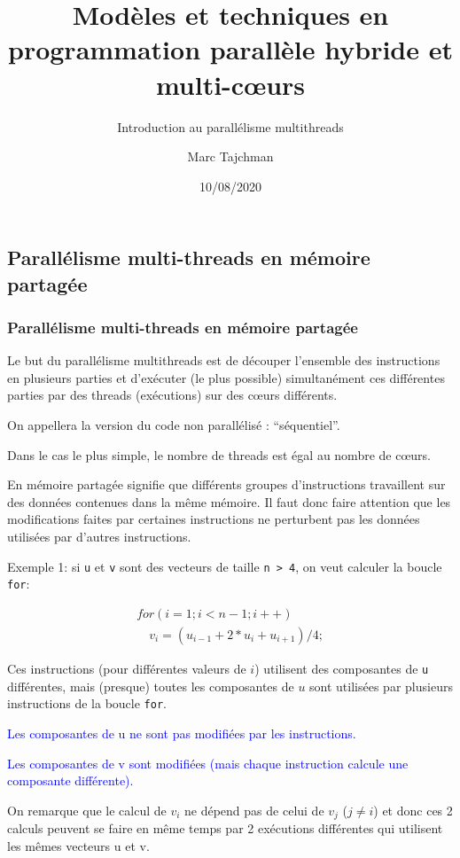 \documentclass{beamer}
\title{Modèles et techniques en programmation parallèle hybride et multi-c\oe urs}
\subtitle{Introduction au parall\'elisme multithreads}
\author{Marc Tajchman}\institute{CEA - DEN/DM2S/STMF/LMES}
\date{10/08/2020}
\begin{document}
\begin{frame}
	\titlepage
\end{frame}

\large
\begin{frame}
	\section{Parallélisme multi-threads en mémoire partagée}
	\frametitle{Parallélisme multi-threads en mémoire partagée}

	\vfill
	Le but du parallélisme multithreads est de découper l'ensemble des instructions en plusieurs parties et d'exécuter (le plus possible) simultanément ces différentes parties par des threads (exécutions) sur des c\oe urs différents.


	\vfill
	On appellera la version du code non parallélisé : ``séquentiel''.

	\vfill
    Dans le cas le plus simple, le nombre de threads est égal au nombre de c\oe urs.

	\vfill
	En mémoire partagée signifie que différents groupes d'instructions travaillent sur des données contenues dans la même mémoire. Il faut donc faire attention que les modifications faites par certaines instructions ne perturbent pas les données utilisées par d'autres instructions.
	\vfill

\end{frame}

\large
\begin{frame}[fragile]
	Exemple 1: si \verb|u| et \verb|v| sont des vecteurs de taille \verb|n > 4|, on veut calculer la boucle {\tt for}:

	\begin{equation}
	\begin{array}{l}
for (i=1; i<n-1; i++) \\
\quad  v_i = (u_{i-1} + 2*u_{i} + u_{i+1})/4;
\end{array}
	\end{equation}

	\vfill
	Ces instructions (pour différentes valeurs de $i$) utilisent des composantes de \verb|u| différentes, mais (presque) toutes les composantes de $u$ sont utilisées par plusieurs instructions de la boucle {\tt for}.

	\vfill
	\textcolor{blue}{Les composantes de u ne sont pas modifiées par les instructions.}

	\vfill
	\textcolor{blue}{Les composantes de v sont modifiées (mais chaque instruction calcule une composante différente).}

	\vfill
	On remarque que le calcul de $v_i$ ne dépend pas de celui de $v_j$ ($j \neq i$) et donc ces 2 calculs peuvent se faire en même temps par 2 ex\'ecutions différentes qui utilisent les mêmes vecteurs u et v.

\end{frame}
\end{document}
